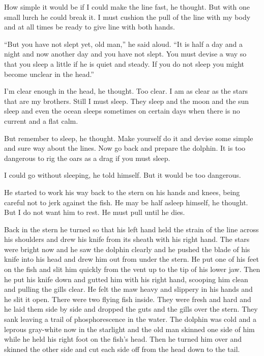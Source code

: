 \documentclass[fontset=ubuntu,zihao=-4]{ctexrep}
\newlength{\drop}%
\begin{document}
How simple it would be if I could make the line fast, he thought. But with
one small lurch he could break it. I must \gls{cushion} the pull of the line
with my body and at all times be ready to give line with both hands.

``But you have not slept yet, old man,'' he said aloud. ``It is half a day
and a night and now another day and you have not slept. You must
\gls{devise} a way so that you sleep a little if he is quiet and steady. If
you do not sleep you might become unclear in the head.''

I'm clear enough in the head, he thought. Too clear. I am as clear as the
stars that are my brothers. Still I must sleep. They sleep and the moon and
the sun sleep and even the ocean sleeps sometimes on certain days when there
is no current and a flat calm.

But remember to sleep, he thought. Make yourself do it and devise some
simple and sure way about the lines. Now go back and prepare the dolphin. It
is too dangerous to \gls{rig} the oars as a drag if you must sleep.

I could go without sleeping, he told himself. But it would be too dangerous.

He started to work his way back to the stern on his hands and knees, being
careful not to jerk against the fish. He may be half asleep himself, he
thought. But I do not want him to rest. He must pull until he dies.

Back in the stern he turned so that his left hand held the strain of the
line across his shoulders and drew his knife from its sheath with his right
hand. The stars were bright now and he saw the dolphin clearly and he pushed
the blade of his knife into his head and drew him out from under the stern.
He put one of his feet on the fish and \gls{slit} him quickly from the
\gls{vent} up to the \gls{tip} of his lower jaw. Then he put his knife down
and \gls{gutted} him with his right hand, scooping him clean and pulling the
\glspl{gill} clear. He felt the \gls{maw} heavy and \gls{slippery} in his
hands and he slit it open. There were two flying fish inside. They were
fresh and hard and he laid them side by side and dropped the guts and the
gills over the stern. They \gls{sank} leaving a trail of phosphorescence in
the water. The dolphin was cold and a \gls{leprous} gray-white now in the
starlight and the old man skinned one side of him while he held his right
foot on the fish's head. Then he turned him over and skinned the other side
and cut each side off from the head down to the tail.
\end{document}
